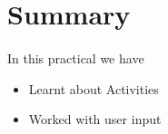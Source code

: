 \documentclass[12pt, a4paper, twoside]{book}
\begin{document}
\section{Summary}
\paragraph{} In this practical we have 

\begin{itemize}
\item Learnt about Activities
\item Worked with user input
\end{itemize}

\backmatter




\end{document}
